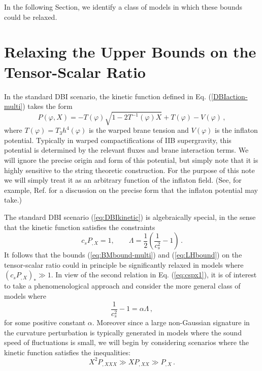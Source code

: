 In the following Section, we identify a class of models in which  
these bounds could be relaxed. 
% 
% 
\section{Relaxing the Upper Bounds on the Tensor-Scalar Ratio}
\label{sec:relaxing-multi}
% 

In the standard DBI scenario, the kinetic function defined in 
Eq. (\ref{DBIaction-multi})  takes the form
%  
\begin{equation}
\label{eq:DBIkinetic}
P (\varphi , X) = -T(\varphi ) \sqrt{1-2T^{-1}(\varphi ) X} + T(\varphi ) - V(\varphi ) \,,
\end{equation}
% 
where $T(\varphi ) = T_3 h^4 (\varphi )$ 
is the warped brane tension and  $V(\varphi )$ is the 
inflaton potential. 
Typically in warped compactifications of 
IIB supergravity, this potential is determined by the 
relevant fluxes and brane interaction terms. 
We will ignore the precise origin
and form of this potential, but simply
note that it is highly sensitive to the string theoretic construction. For the
purpose of this note we will simply treat it 
as an arbitrary function of the inflaton field.
(See, for example, Ref. \cite{brane5} for a discussion 
on the precise form that the inflaton potential may take.)


The standard DBI scenario (\ref{eq:DBIkinetic}) is algebraically special, 
in the sense that the kinetic function satisfies the constraints 
% 
\begin{equation}
\label{eq:cspx1}
c_s P_{,X} = 1 , \qquad  \Lambda = \frac{1}{2} \left( 
\frac{1}{c_s^2} -1 \right) \,.
\end{equation}
% 
It follows that the 
bounds (\ref{eq:BMbound-multi}) and (\ref{eq:LHbound}) 
on the tensor-scalar ratio could in principle be 
significantly relaxed in models where $(c_sP_{,X})_* \gg 1$. 
In view of the second relation in Eq. (\ref{eq:cspx1}), it is of interest 
to take a phenomenological approach and consider the more  
general class of models where
%  
\begin{equation}
\label{eq:defalpha}
\frac{1}{c_s^2} -1 = \alpha \Lambda \,,
\end{equation}
% 
for some positive constant $\alpha$. Moreover since 
a large non-Gaussian signature in the curvature perturbation is 
typically generated in models where the sound speed of fluctuations 
is small, we will begin by considering 
scenarios where the kinetic function satisfies the 
inequalities: 
% 
\begin{equation}
\label{eq:Plimits}
X^2 P_{,XXX} \gg XP_{,XX} \gg P_{,X} \,.
\end{equation}
% 


